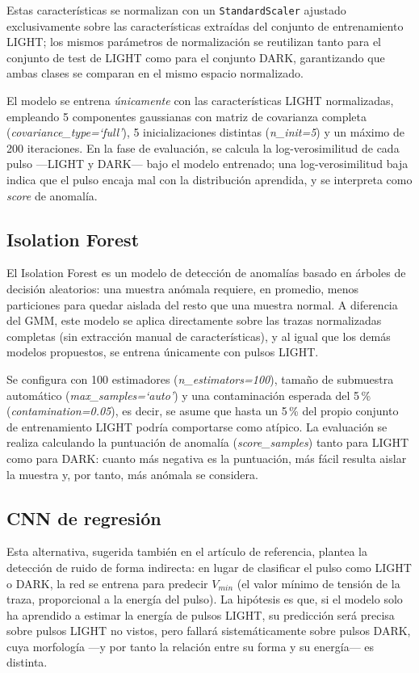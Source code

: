 Estas características se normalizan con un \texttt{StandardScaler} ajustado exclusivamente sobre las características extraídas del conjunto de entrenamiento LIGHT; los mismos parámetros de normalización se reutilizan tanto para el conjunto de test de LIGHT como para el conjunto DARK, garantizando que ambas clases se comparan en el mismo espacio normalizado.

El modelo se entrena \emph{únicamente} con las características LIGHT normalizadas, empleando 5 componentes gaussianas con matriz de covarianza completa (\textit{covariance\_type=`full'}), 5 inicializaciones distintas (\textit{n\_init=5}) y un máximo de 200 iteraciones. En la fase de evaluación, se calcula la log-verosimilitud de cada pulso —LIGHT y DARK— bajo el modelo entrenado; una log-verosimilitud baja indica que el pulso encaja mal con la distribución aprendida, y se interpreta como \textit{score} de anomalía.

\subsection{Isolation Forest}
\label{sec:isolation-forest}

El Isolation Forest es un modelo de detección de anomalías basado en árboles de decisión aleatorios: una muestra anómala requiere, en promedio, menos particiones para quedar aislada del resto que una muestra normal. A diferencia del GMM, este modelo se aplica directamente sobre las trazas normalizadas completas (sin extracción manual de características), y al igual que los demás modelos propuestos, se entrena únicamente con pulsos LIGHT.

Se configura con 100 estimadores (\textit{n\_estimators=100}), tamaño de submuestra automático (\textit{max\_samples=`auto'}) y una contaminación esperada del 5\,\% (\textit{contamination=0.05}), es decir, se asume que hasta un 5\,\% del propio conjunto de entrenamiento LIGHT podría comportarse como atípico. La evaluación se realiza calculando la puntuación de anomalía (\textit{score\_samples}) tanto para LIGHT como para DARK: cuanto más negativa es la puntuación, más fácil resulta aislar la muestra y, por tanto, más anómala se considera.

\subsection{CNN de regresión}
\label{sec:cnn-regresion}

Esta alternativa, sugerida también en el artículo de referencia, plantea la detección de ruido de forma indirecta: en lugar de clasificar el pulso como LIGHT o DARK, la red se entrena para predecir $V_{min}$ (el valor mínimo de tensión de la traza, proporcional a la energía del pulso). La hipótesis es que, si el modelo solo ha aprendido a estimar la energía de pulsos LIGHT, su predicción será precisa sobre pulsos LIGHT no vistos, pero fallará sistemáticamente sobre pulsos DARK, cuya morfología —y por tanto la relación entre su forma y su energía— es distinta.

